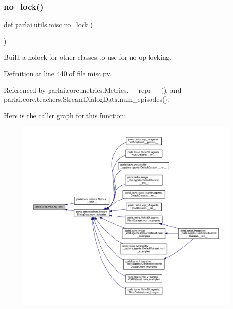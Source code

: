 \subsubsection{\texorpdfstring{no\+\_\+lock()}{no\_lock()}}
{\footnotesize\ttfamily def parlai.\+utils.\+misc.\+no\+\_\+lock (\begin{DoxyParamCaption}{ }\end{DoxyParamCaption})}

\begin{DoxyVerb}Build a nolock for other classes to use for no-op locking.\end{DoxyVerb}
 

Definition at line 440 of file misc.\+py.



Referenced by parlai.\+core.\+metrics.\+Metrics.\+\_\+\+\_\+repr\+\_\+\+\_\+(), and parlai.\+core.\+teachers.\+Stream\+Dialog\+Data.\+num\+\_\+episodes().

Here is the caller graph for this function\+:
\nopagebreak
\begin{figure}[H]
\begin{center}
\leavevmode
\includegraphics[width=350pt]{namespaceparlai_1_1utils_1_1misc_a38a23cfa0fc3dbed42846787d1c04b57_icgraph}
\end{center}
\end{figure}
\mbox{\label{namespaceparlai_1_1utils_1_1misc_ad96b0c9ef6237d9ca051251089faf2c7}} 
